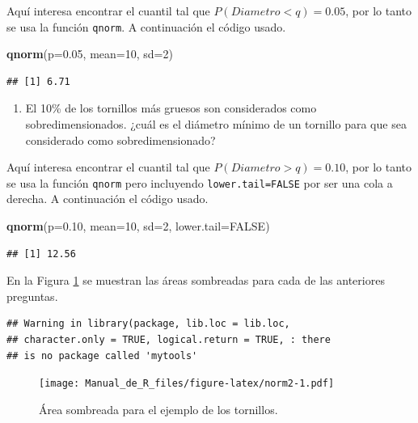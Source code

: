 \documentclass[10pt,]{krantz}
\makeatletter
\newenvironment{Shaded}{\begin{snugshade}}{\end{snugshade}}
\newcommand{\KeywordTok}[1]{\textcolor[rgb]{0.13,0.29,0.53}{\textbf{{#1}}}}
\newcommand{\DataTypeTok}[1]{\textcolor[rgb]{0.13,0.29,0.53}{{#1}}}
\newcommand{\DecValTok}[1]{\textcolor[rgb]{0.00,0.00,0.81}{{#1}}}
\newcommand{\FloatTok}[1]{\textcolor[rgb]{0.00,0.00,0.81}{{#1}}}
\newcommand{\OtherTok}[1]{\textcolor[rgb]{0.56,0.35,0.01}{{#1}}}
\newcommand{\NormalTok}[1]{{#1}}
\providecommand{\tightlist}{%
  \setlength{\itemsep}{0pt}\setlength{\parskip}{0pt}}
\newenvironment{kframe}{%
\medskip{}
\setlength{\fboxsep}{.8em}
 \def\at@end@of@kframe{}%
 \ifinner\ifhmode%
  \def\at@end@of@kframe{\end{minipage}}%
  \begin{minipage}{\columnwidth}%
 \fi\fi%
 \def\FrameCommand##1{\hskip\@totalleftmargin \hskip-\fboxsep
 \colorbox{shadecolor}{##1}\hskip-\fboxsep
     \hskip-\linewidth \hskip-\@totalleftmargin \hskip\columnwidth}%
 \MakeFramed {\advance\hsize-\width
   \@totalleftmargin\z@ \linewidth\hsize
   \@setminipage}}%
 {\par\unskip\endMakeFramed%
 \at@end@of@kframe}
\renewenvironment{Shaded}{\begin{kframe}}{\end{kframe}}
\makeatother
\begin{document}
Aquí interesa encontrar el cuantil tal que \(P(Diametro<q)=0.05\), por
lo tanto se usa la función \texttt{qnorm}. A continuación el código
usado.

\begin{Shaded}
\begin{Highlighting}[]
\KeywordTok{qnorm}\NormalTok{(}\DataTypeTok{p=}\FloatTok{0.05}\NormalTok{, }\DataTypeTok{mean=}\DecValTok{10}\NormalTok{, }\DataTypeTok{sd=}\DecValTok{2}\NormalTok{)}
\end{Highlighting}
\end{Shaded}

\begin{verbatim}
## [1] 6.71
\end{verbatim}

\begin{enumerate}
\def\labelenumi{\arabic{enumi})}
\setcounter{enumi}{3}
\tightlist
\item
  El 10\% de los tornillos más gruesos son considerados como
  sobredimensionados. ¿cuál es el diámetro mínimo de un tornillo para
  que sea considerado como sobredimensionado?
\end{enumerate}

Aquí interesa encontrar el cuantil tal que \(P(Diametro>q)=0.10\), por
lo tanto se usa la función \texttt{qnorm} pero incluyendo
\texttt{lower.tail=FALSE} por ser una cola a derecha. A continuación el
código usado.

\begin{Shaded}
\begin{Highlighting}[]
\KeywordTok{qnorm}\NormalTok{(}\DataTypeTok{p=}\FloatTok{0.10}\NormalTok{, }\DataTypeTok{mean=}\DecValTok{10}\NormalTok{, }\DataTypeTok{sd=}\DecValTok{2}\NormalTok{, }\DataTypeTok{lower.tail=}\OtherTok{FALSE}\NormalTok{)}
\end{Highlighting}
\end{Shaded}

\begin{verbatim}
## [1] 12.56
\end{verbatim}

En la Figura \ref{fig:norm2} se muestran las áreas sombreadas para cada
de las anteriores preguntas.

\begin{verbatim}
## Warning in library(package, lib.loc = lib.loc,
## character.only = TRUE, logical.return = TRUE, : there
## is no package called 'mytools'
\end{verbatim}

\begin{figure}[htbp]
\centering
\texttt{[image: Manual\_de\_R\_files/figure-latex/norm2-1.pdf]}
\caption{\label{fig:norm2}Área sombreada para el ejemplo de los tornillos.}
\end{figure}
\end{document}

